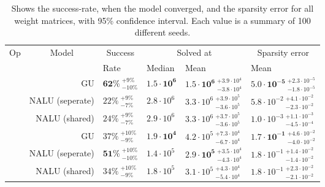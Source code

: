 \begin{table}[!h]

\caption{\label{tab:simple-function-static-nalu-gate-table}Shows the success-rate, when the model converged, and the sparsity error for all weight matrices, with 95\% confidence interval. Each value is a summary of 100 different seeds.}
\centering
\begin{tabular}{crllll}
\toprule
\multicolumn{1}{c}{Op} & \multicolumn{1}{c}{Model} & \multicolumn{1}{c}{Success} & \multicolumn{2}{c}{Solved at} & \multicolumn{1}{c}{Sparsity error} \\
\cmidrule(l{3pt}r{3pt}){1-1} \cmidrule(l{3pt}r{3pt}){2-2} \cmidrule(l{3pt}r{3pt}){3-3} \cmidrule(l{3pt}r{3pt}){4-5} \cmidrule(l{3pt}r{3pt}){6-6}
 &  & Rate & Median & Mean & Mean\\
\midrule
 & GU & $\mathbf{62\%} {~}^{+9\%}_{-10\%}$ & $\mathbf{1.5 \cdot 10^{6}}$ & $\mathbf{1.5 \cdot 10^{6}} {~}^{+3.9 \cdot 10^{4}}_{-3.8 \cdot 10^{4}}$ & $\mathbf{5.0 \cdot 10^{-5}} {~}^{+2.3 \cdot 10^{-5}}_{-1.8 \cdot 10^{-5}}$\\

\nopagebreak
 & NALU (seperate) & $22\% {~}^{+9\%}_{-7\%}$ & $2.8 \cdot 10^{6}$ & $3.3 \cdot 10^{6} {~}^{+3.9 \cdot 10^{5}}_{-3.6 \cdot 10^{5}}$ & $5.8 \cdot 10^{-2} {~}^{+4.1 \cdot 10^{-2}}_{-2.3 \cdot 10^{-2}}$\\

\nopagebreak
\multirow{-3}{*}{\centering\arraybackslash $\bm{\times}$} & NALU (shared) & $24\% {~}^{+9\%}_{-7\%}$ & $2.9 \cdot 10^{6}$ & $3.3 \cdot 10^{6} {~}^{+3.7 \cdot 10^{5}}_{-3.6 \cdot 10^{5}}$ & $1.0 \cdot 10^{-3} {~}^{+1.1 \cdot 10^{-3}}_{-4.5 \cdot 10^{-4}}$\\
\cmidrule{1-6}
 & GU & $37\% {~}^{+10\%}_{-9\%}$ & $\mathbf{1.9 \cdot 10^{4}}$ & $4.2 \cdot 10^{5} {~}^{+7.3 \cdot 10^{4}}_{-6.7 \cdot 10^{4}}$ & $\mathbf{1.7 \cdot 10^{-1}} {~}^{+4.6 \cdot 10^{-2}}_{-4.0 \cdot 10^{-2}}$\\

\nopagebreak
 & NALU (seperate) & $\mathbf{51\%} {~}^{+10\%}_{-10\%}$ & $1.4 \cdot 10^{5}$ & $\mathbf{2.9 \cdot 10^{5}} {~}^{+3.5 \cdot 10^{4}}_{-4.3 \cdot 10^{4}}$ & $1.8 \cdot 10^{-1} {~}^{+1.4 \cdot 10^{-2}}_{-1.4 \cdot 10^{-2}}$\\

\nopagebreak
\multirow{-3}{*}{\centering\arraybackslash $\bm{+}$} & NALU (shared) & $34\% {~}^{+10\%}_{-9\%}$ & $1.8 \cdot 10^{5}$ & $3.1 \cdot 10^{5} {~}^{+4.3 \cdot 10^{4}}_{-5.4 \cdot 10^{4}}$ & $1.8 \cdot 10^{-1} {~}^{+2.3 \cdot 10^{-2}}_{-2.1 \cdot 10^{-2}}$\\
\bottomrule
\end{tabular}
\end{table}

